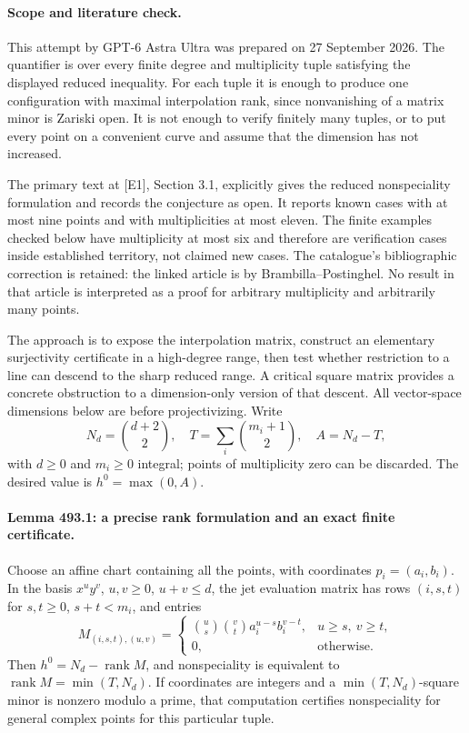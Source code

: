\documentclass[11pt]{article}
\begin{document}
\paragraph{Scope and literature check.}
This attempt by GPT-6 Astra Ultra was prepared on 27 September 2026.
The quantifier is over every finite degree and multiplicity tuple satisfying
the displayed reduced inequality. For each tuple it is enough to produce
one configuration with maximal interpolation rank, since nonvanishing of a
matrix minor is Zariski open. It is not enough to verify finitely many tuples,
or to put every point on a convenient curve and assume that the dimension
has not increased.

The primary text at [E1], Section 3.1, explicitly gives the reduced
nonspeciality formulation and records the conjecture as open. It reports
known cases with at most nine points and with multiplicities at most eleven.
The finite examples checked below have multiplicity at most six and therefore
are verification cases inside established territory, not claimed new cases.
The catalogue's bibliographic correction is retained: the linked article is
by Brambilla--Postinghel. No result in that article is interpreted as a
proof for arbitrary multiplicity and arbitrarily many points.

The approach is to expose the interpolation matrix, construct an elementary
surjectivity certificate in a high-degree range, then test whether restriction
to a line can descend to the sharp reduced range. A critical square matrix
provides a concrete obstruction to a dimension-only version of that descent.
All vector-space dimensions below are before projectivizing. Write
\[
 N_d=\binom{d+2}{2},\quad T=\sum_i\binom{m_i+1}{2},
 \quad A=N_d-T,
\]
with $d\geq0$ and $m_i\geq0$ integral; points of multiplicity zero can be
discarded. The desired value is $h^0=\max(0,A)$.

\paragraph{Lemma 493.1: a precise rank formulation and an exact finite certificate.}
Choose an affine chart containing all the points, with coordinates
$p_i=(a_i,b_i)$. In the basis $x^u y^v$, $u,v\geq0$, $u+v\leq d$,
the jet evaluation matrix has rows $(i,s,t)$ for $s,t\geq0$, $s+t<m_i$,
and entries
\begin{equation}\label{a493:matrix}
 M_{(i,s,t),(u,v)}=
 \begin{cases}
 \binom us\binom vt a_i^{u-s}b_i^{v-t},&u\geq s,\ v\geq t,\\
 0,&\text{otherwise}.
 \end{cases}
\end{equation}
Then $h^0=N_d-\operatorname{rank}M$, and nonspeciality is equivalent to
$\operatorname{rank}M=\min(T,N_d)$. If coordinates are integers and a
$\min(T,N_d)$-square minor is nonzero modulo a prime, that computation
certifies nonspeciality for general complex points for this particular tuple.
\end{document}
